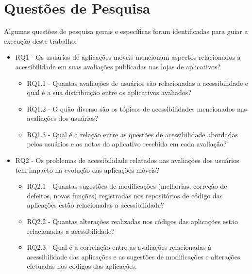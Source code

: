 


\section{Questões de Pesquisa}

Algumas questões de pesquisa gerais e específicas foram identificadas para guiar a execução deste trabalho:
\begin{itemize}
 \item RQ1 - Os usuários de aplicações móveis mencionam aspectos relacionados a acessibilidade em suas avaliações publicadas nas lojas de aplicativos?
    \begin{itemize}
       \item RQ1.1 - Quantas avaliações de usuários são relacionadas a acessibilidade e qual é a sua distribuição entre os aplicativos avaliados?
       \item RQ1.2 - O quão diverso são os tópicos de acessibilidades mencionados nas avaliações dos usuários?
        \item RQ1.3 - Qual é a relação entre as questões de acessibilidade abordadas pelos usuários e as notas do aplicativo recebida em cada avaliação?
 \end{itemize}
  \item RQ2 - Os problemas de acessibilidade relatados nas avaliações dos usuários tem impacto na evolução das aplicações móveis?
        \begin{itemize}
        \item RQ2.1 - Quantas sugestões de modificações (melhorias, correção de defeitos, novas funções) registradas nos repositórios de código das aplicações estão relacionadas a acessibilidade?
        \item RQ2.2 - Quantas alterações realizadas nos códigos das aplicações estão relacionadas a acessibilidade?
        \item RQ2.3 - Qual é a correlação entre as avaliações relacionadas à acessibilidade das aplicações e as sugestões de modificações e alterações efetuadas nos códigos das aplicações.
        \end{itemize}
\end{itemize}

